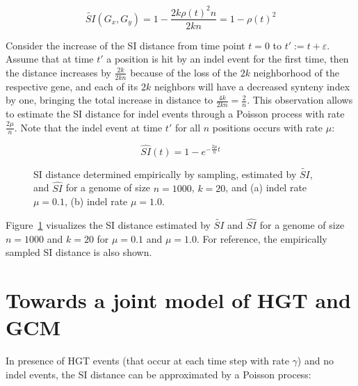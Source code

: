 \documentclass[9pt,english,utf8]{article}
\begin{document}
\begin{equation}
    \widetilde{SI}(G_x, G_y) = 1-\frac{2k\rho(t)^2n}{2kn} = 1-\rho(t)^2
\end{equation}

Consider the increase of the SI distance from time point $t=0$ to $t' :=
t+\varepsilon$. Assume that at time $t'$ a position is hit by an indel event for
the first time, then the distance increases by $\frac{2k}{2kn}$ because of the
loss of the $2k$ neighborhood of the respective gene, and each of its $2k$
neighbors will have a decreased synteny index by one, bringing the total
increase in distance to $\frac{4k}{2kn} = \frac{2}{n}$.  This observation allows
to estimate the SI distance for indel events through a Poisson process with rate
$\frac{2\mu}{n}$. Note that the indel event at time $t'$ for all $n$ positions
occurs with rate $\mu$:

\begin{equation}
    \widehat{SI}(t) = 1-e^{-\frac{2\mu}{n}t}
\end{equation}



\begin{figure}[tb]
    \centering 
    \caption{SI distance determined empirically by sampling, estimated by
    $\widetilde{SI}$, and $\widehat{SI}$ for a genome of size $n=1000$, $k=20$,
    and (a) indel rate $\mu=0.1$, (b) indel rate $\mu=1.0$. }
    \label{fig:si_distance_hgtonly}
\end{figure}

Figure~\ref{fig:si_distance_hgtonly} visualizes the SI distance estimated by
$\widetilde{SI}$ and $\widehat{SI}$ for a genome of size $n=1000$ and $k=20$ for
$\mu = 0.1$ and $\mu = 1.0$. For reference, the empirically sampled SI distance
is also shown. 

\section{Towards a joint model of HGT and GCM}

In presence of HGT events (that occur at each time step with rate $\gamma$) and
no indel events, the SI distance can be approximated by a Poisson process:
\end{document}
